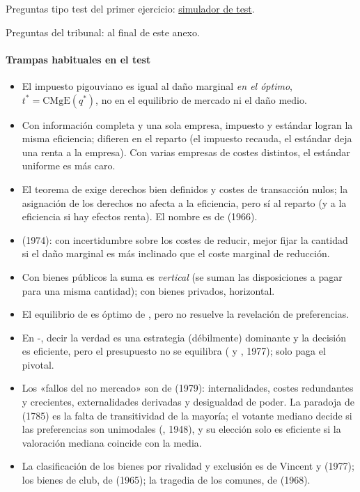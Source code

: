 \documentclass[11pt]{article}
\begin{document}
\begin{anotaciones}
Preguntas tipo test del primer ejercicio: \href{https://www.victorgutierrezmarcos.es/oposicion/temario/primer-ejercicio/test/simulador.html?tema=3.A.23}{simulador de test}.

Preguntas del tribunal: al final de este anexo.
\end{anotaciones}

\paragraph{Trampas habituales en el test}
\begin{itemize}
\item El impuesto pigouviano es igual al daño marginal \emph{en el óptimo}, $t^*=\mathrm{CMgE}(q^*)$, no en el equilibrio de mercado ni el daño medio.
\item Con información completa y una sola empresa, impuesto y estándar logran la misma eficiencia; difieren en el reparto (el impuesto recauda, el estándar deja una renta a la empresa). Con varias empresas de costes distintos, el estándar uniforme es más caro.
\item El teorema de  exige derechos bien definidos y costes de transacción nulos; la asignación de los derechos no afecta a la eficiencia, pero sí al reparto (y a la eficiencia si hay efectos renta). El nombre es de  (1966).
\item {} (1974): con incertidumbre sobre los costes de reducir, mejor fijar la cantidad si el daño marginal es más inclinado que el coste marginal de reducción.
\item Con bienes públicos la suma es \emph{vertical} (se suman las disposiciones a pagar para una misma cantidad); con bienes privados, horizontal.
\item El equilibrio de  es óptimo de , pero no resuelve la revelación de preferencias.
\item En -, decir la verdad es una estrategia (débilmente) dominante y la decisión es eficiente, pero el presupuesto no se equilibra ( y , 1977); solo paga el pivotal.
\item Los «fallos del no mercado» son de  (1979): internalidades, costes redundantes y crecientes, externalidades derivadas y desigualdad de poder. La paradoja de  (1785) es la falta de transitividad de la mayoría; el votante mediano decide si las preferencias son unimodales (, 1948), y su elección solo es eficiente si la valoración mediana coincide con la media.
\item La clasificación de los bienes por rivalidad y exclusión es de Vincent y  (1977); los bienes de club, de  (1965); la tragedia de los comunes, de  (1968).
\end{itemize}
\end{document}
